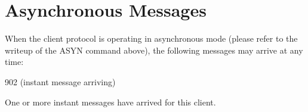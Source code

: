 \chapter{Asynchronous Messages}

 When the client protocol is operating in asynchronous mode (please refer to
the writeup of the ASYN command above), the following messages may arrive at
any time:


 902  (instant message arriving)

 One or more instant messages have arrived for this client.
